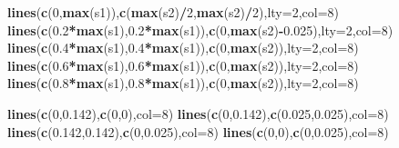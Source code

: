 \documentclass[]{article}
\newenvironment{Shaded}{\begin{snugshade}}{\end{snugshade}}
\newcommand{\DataTypeTok}[1]{\textcolor[rgb]{0.13,0.29,0.53}{#1}}
\newcommand{\DecValTok}[1]{\textcolor[rgb]{0.00,0.00,0.81}{#1}}
\newcommand{\FloatTok}[1]{\textcolor[rgb]{0.00,0.00,0.81}{#1}}
\newcommand{\KeywordTok}[1]{\textcolor[rgb]{0.13,0.29,0.53}{\textbf{#1}}}
\newcommand{\NormalTok}[1]{#1}
\newcommand{\OperatorTok}[1]{\textcolor[rgb]{0.81,0.36,0.00}{\textbf{#1}}}
\begin{document}
\begin{Shaded}
\begin{Highlighting}[]
\KeywordTok{lines}\NormalTok{(}\KeywordTok{c}\NormalTok{(}\DecValTok{0}\NormalTok{,}\KeywordTok{max}\NormalTok{(s1)),}\KeywordTok{c}\NormalTok{(}\KeywordTok{max}\NormalTok{(s2)}\OperatorTok{/}\DecValTok{2}\NormalTok{,}\KeywordTok{max}\NormalTok{(s2)}\OperatorTok{/}\DecValTok{2}\NormalTok{),}\DataTypeTok{lty=}\DecValTok{2}\NormalTok{,}\DataTypeTok{col=}\DecValTok{8}\NormalTok{)}
\KeywordTok{lines}\NormalTok{(}\KeywordTok{c}\NormalTok{(}\FloatTok{0.2}\OperatorTok{*}\KeywordTok{max}\NormalTok{(s1),}\FloatTok{0.2}\OperatorTok{*}\KeywordTok{max}\NormalTok{(s1)),}\KeywordTok{c}\NormalTok{(}\DecValTok{0}\NormalTok{,}\KeywordTok{max}\NormalTok{(s2)}\OperatorTok{-}\FloatTok{0.025}\NormalTok{),}\DataTypeTok{lty=}\DecValTok{2}\NormalTok{,}\DataTypeTok{col=}\DecValTok{8}\NormalTok{)}
\KeywordTok{lines}\NormalTok{(}\KeywordTok{c}\NormalTok{(}\FloatTok{0.4}\OperatorTok{*}\KeywordTok{max}\NormalTok{(s1),}\FloatTok{0.4}\OperatorTok{*}\KeywordTok{max}\NormalTok{(s1)),}\KeywordTok{c}\NormalTok{(}\DecValTok{0}\NormalTok{,}\KeywordTok{max}\NormalTok{(s2)),}\DataTypeTok{lty=}\DecValTok{2}\NormalTok{,}\DataTypeTok{col=}\DecValTok{8}\NormalTok{)}
\KeywordTok{lines}\NormalTok{(}\KeywordTok{c}\NormalTok{(}\FloatTok{0.6}\OperatorTok{*}\KeywordTok{max}\NormalTok{(s1),}\FloatTok{0.6}\OperatorTok{*}\KeywordTok{max}\NormalTok{(s1)),}\KeywordTok{c}\NormalTok{(}\DecValTok{0}\NormalTok{,}\KeywordTok{max}\NormalTok{(s2)),}\DataTypeTok{lty=}\DecValTok{2}\NormalTok{,}\DataTypeTok{col=}\DecValTok{8}\NormalTok{)}
\KeywordTok{lines}\NormalTok{(}\KeywordTok{c}\NormalTok{(}\FloatTok{0.8}\OperatorTok{*}\KeywordTok{max}\NormalTok{(s1),}\FloatTok{0.8}\OperatorTok{*}\KeywordTok{max}\NormalTok{(s1)),}\KeywordTok{c}\NormalTok{(}\DecValTok{0}\NormalTok{,}\KeywordTok{max}\NormalTok{(s2)),}\DataTypeTok{lty=}\DecValTok{2}\NormalTok{,}\DataTypeTok{col=}\DecValTok{8}\NormalTok{)}

\KeywordTok{lines}\NormalTok{(}\KeywordTok{c}\NormalTok{(}\DecValTok{0}\NormalTok{,}\FloatTok{0.142}\NormalTok{),}\KeywordTok{c}\NormalTok{(}\DecValTok{0}\NormalTok{,}\DecValTok{0}\NormalTok{),}\DataTypeTok{col=}\DecValTok{8}\NormalTok{)}
\KeywordTok{lines}\NormalTok{(}\KeywordTok{c}\NormalTok{(}\DecValTok{0}\NormalTok{,}\FloatTok{0.142}\NormalTok{),}\KeywordTok{c}\NormalTok{(}\FloatTok{0.025}\NormalTok{,}\FloatTok{0.025}\NormalTok{),}\DataTypeTok{col=}\DecValTok{8}\NormalTok{)}
\KeywordTok{lines}\NormalTok{(}\KeywordTok{c}\NormalTok{(}\FloatTok{0.142}\NormalTok{,}\FloatTok{0.142}\NormalTok{),}\KeywordTok{c}\NormalTok{(}\DecValTok{0}\NormalTok{,}\FloatTok{0.025}\NormalTok{),}\DataTypeTok{col=}\DecValTok{8}\NormalTok{)}
\KeywordTok{lines}\NormalTok{(}\KeywordTok{c}\NormalTok{(}\DecValTok{0}\NormalTok{,}\DecValTok{0}\NormalTok{),}\KeywordTok{c}\NormalTok{(}\DecValTok{0}\NormalTok{,}\FloatTok{0.025}\NormalTok{),}\DataTypeTok{col=}\DecValTok{8}\NormalTok{)}


\end{Highlighting}
\end{Shaded}
\end{document}
